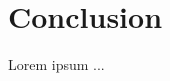 \documentclass[Conclusion]{subfiles}
\begin{document}
\section{Conclusion}
\label{sec:Conclusion}
Lorem ipsum ...
\end{document}
